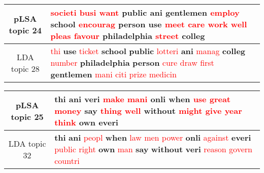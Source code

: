 \begin{center}\begin{tabularx}{\textwidth} {
  | c | >{\raggedright\arraybackslash}X | } \hline 
pLSA topic 24 & \textcolor{red}{societi} \textcolor{red}{busi} \textcolor{red}{want} \textbf{public} \textbf{ani} \textbf{gentlemen} \textcolor{red}{employ} \textbf{school} \textcolor{red}{encourag} \textbf{person} \textbf{use} \textcolor{red}{meet} \textcolor{red}{care} \textcolor{red}{work} \textcolor{red}{well} \textcolor{red}{pleas} \textcolor{red}{favour} \textbf{philadelphia} \textcolor{red}{street} \textbf{colleg} \\ \hline 
LDA topic 28 & \textcolor{red}{thi} \textbf{use} \textcolor{red}{ticket} \textbf{school} \textbf{public} \textcolor{red}{lotteri} \textbf{ani} \textcolor{red}{manag} \textbf{colleg} \textcolor{red}{number} \textbf{philadelphia} \textbf{person} \textcolor{red}{cure} \textcolor{red}{draw} \textcolor{red}{first} \textbf{gentlemen} \textcolor{red}{mani} \textcolor{red}{citi} \textcolor{red}{prize} \textcolor{red}{medicin} \\ \hline 
\end{tabularx}

\end{center}

\begin{center}\begin{tabularx}{\textwidth} {
  | c | >{\raggedright\arraybackslash}X | } \hline 
pLSA topic 25 & \textbf{thi} \textbf{ani} \textbf{veri} \textcolor{red}{make} \textcolor{red}{mani} \textbf{onli} \textbf{when} \textcolor{red}{use} \textcolor{red}{great} \textcolor{red}{money} \textbf{say} \textcolor{red}{thing} \textcolor{red}{well} \textbf{without} \textcolor{red}{might} \textcolor{red}{give} \textcolor{red}{year} \textcolor{red}{think} \textbf{own} \textbf{everi} \\ \hline 
LDA topic 32 & \textbf{thi} \textbf{ani} \textcolor{red}{peopl} \textbf{when} \textcolor{red}{law} \textcolor{red}{men} \textcolor{red}{power} \textbf{onli} \textcolor{red}{against} \textbf{everi} \textcolor{red}{public} \textcolor{red}{right} \textbf{own} \textcolor{red}{man} \textbf{say} \textbf{without} \textbf{veri} \textcolor{red}{reason} \textcolor{red}{govern} \textcolor{red}{countri} \\ \hline 
\end{tabularx}

\end{center}

